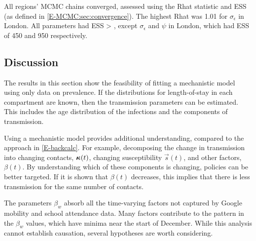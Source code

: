\documentclass[thesis.tex]{subfiles}
\begin{document}
All regions' MCMC chains converged, assessed using the Rhat statistic and ESS (as defined in \cref{E-MCMC:sec:convergence}).
The highest Rhat was 1.01 for $\sigma_\epsilon$ in London.
All parameters had ESS > , except $\sigma_\epsilon$ and $\psi$ in London, which had ESS of 450 and 950 respectively.

\subsection{Discussion} \label{SEIR:sec:discussion}

The results in this section show the feasibility of fitting a mechanistic model using only data on prevalence.
If the distributions for length-of-stay in each compartment are known, then the transmission parameters can be estimated.
This includes the age distribution of the infections and the components of transmission.

Using a mechanistic model provides additional understanding, compared to the approach in \cref{E-backcalc}.
For example, decomposing the change in transmission into changing contacts, $\bm{\kappa}(t)$, changing susceptibility $\vec{s}(t)$, and other factors, $\beta(t)$.
By understanding which of these components is changing, policies can be better targeted.
If it is shown that $\beta(t)$ decreases, this implies that there is less transmission for the same number of contacts.


The parameters $\beta_w$ absorb all the time-varying factors not captured by Google mobility and school attendance data.
Many factors contribute to the pattern in the $\beta_w$ values, which have minima near the start of December.
While this analysis cannot establish causation, several hypotheses are worth considering.
\end{document}
